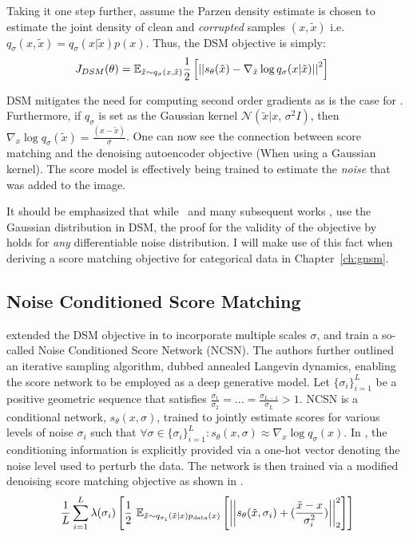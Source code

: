 Taking it one step further, assume the Parzen density estimate is chosen to estimate the joint density of clean and \textit{corrupted} samples $(x, \tilde{x})$ i.e. $q_{\sigma}(x, \tilde{x}) = q_{\sigma}(x | \tilde{x} ) p(x) $. Thus, the DSM objective is simply:
\begin{align}
\label{eq:denoising_sm}
    J_{DSM}(\theta) &= \mathbb{E}_{\tilde{x}\sim q_{\sigma}(x, \tilde{x})} \frac{1}{2} \left[ { \left|\left| {s_\theta(\tilde{x}) - \nabla_{\tilde{x}} \log q_{\sigma}(x | \tilde{x}) } \right|\right|^2 } \right]
\end{align}

DSM mitigates the need for computing second order gradients as is the case for . Furthermore, if $q_{\sigma}$ is set as the Gaussian kernel $\mathcal{N}(\tilde{x} |  x,\,\sigma^{2}I)$, then $\nabla_x \log q_{\sigma}(\tilde{x}) = \frac{(x - \tilde{x})}{\sigma}$. One can now see the connection between score matching and the denoising autoencoder objective (When using a Gaussian kernel). The score model is effectively being trained to estimate the \textit{noise} that was added to the image.

It should be emphasized that while~\cite{vincent2011connection} and many subsequent works \cite{Song2019,song2020improved,song2020score}, use the Gaussian distribution in DSM, the proof for the validity of the objective by~\cite{vincent2011connection} holds for \textit{any} differentiable noise distribution.
I will make use of this fact when deriving a score matching objective for categorical data in Chapter~\ref{ch:gnsm}.

\subsection*{Noise Conditioned Score Matching}
\label{NCSM}

\cite{Song2019} extended the DSM objective in  to incorporate multiple scales $\sigma$, and train a so-called Noise Conditioned Score Network (NCSN). The authors further outlined an iterative sampling algorithm, dubbed annealed Langevin dynamics, enabling the score network to be employed as a deep generative model. Let $\{\sigma_i\}_{i=1}^L$ be a positive geometric sequence that satisfies $\frac{\sigma_1}{\sigma_2} = ... = \frac{\sigma_{L-1}}{\sigma_{L}} >  1$. NCSN is a conditional network, $s_{\theta}(x,\sigma)$, trained to jointly estimate scores for various levels of noise $\sigma_i$ such that $\forall \sigma \in \{\sigma_i\}_{i=1}^L: s_{\theta}(x,\sigma) \approx \nabla_x \log q_{\sigma}(x)$. In \cite{Song2019}, the conditioning information is explicitly provided via a one-hot vector denoting the noise level used to perturb the data. The network is then trained via a modified denoising score matching objective as shown in .
\begin{equation}
\label{eq:ncsn_dsm}
\frac{1}{L} \sum_{i=1}^L \lambda(\sigma_i)
\left[ {\frac{1}{2} \displaystyle \text{~} \mathbb{E}_{\tilde{x}\sim q_{\sigma_i} (\tilde{x}|x) p_{\text{data}}(x)} \left[ { \left|\left| { s_{\theta}(\tilde{x}, \sigma_i) + (\frac{\tilde{x} - x}{\sigma_i^2}) } \right|\right|^2_2  } \right] } \right]
\end{equation}

